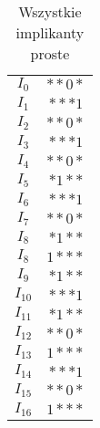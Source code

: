 \begin{table}[H]
    \centering
    \begin{tabular}[t]{ |c|c| }
        \hline
        $I_0$ & ${*}{*}0{*}$ \\
        $I_1$ & ${*}{*}{*}1$ \\
        \sout{$I_2$} & \sout{${*}{*}0{*}$} \\
        \sout{$I_3$} & \sout{${*}{*}{*}1$} \\
        \sout{$I_4$} & \sout{${*}{*}0{*}$}\\
        $I_5$ & ${*}1{*}{*}$ \\
        \sout{$I_6$} & \sout{${*}{*}{*}1$} \\
        \sout{$I_7$} & \sout{${*}{*}0{*}$} \\
        \sout{$I_8$} & \sout{${*}1{*}{*}$} \\
        $I_8$ & $1{*}{*}{*}$ \\
        \sout{$I_9$} & \sout{${*}1{*}{*}$} \\
        \sout{$I_{10}$} & \sout{${*}{*}{*}1$} \\
        \sout{$I_{11}$} &\sout{ ${*}1{*}{*}$} \\
        \sout{$I_{12}$} & \sout{${*}{*}0{*}$} \\
        \sout{ $I_{13}$} & \sout{$1{*}{*}{*}$} \\
        \sout{$I_{14}$} & \sout{${*}{*}{*}1$} \\
        \sout{$I_{15}$} & \sout{${*}{*}0{*}$} \\
        \sout{$I_{16}$} & \sout{$1{*}{*}{*}$} \\
        \hline
    \end{tabular}
    \caption{Wszystkie implikanty proste} \label{tab:all-implicantsc}
\end{table}

